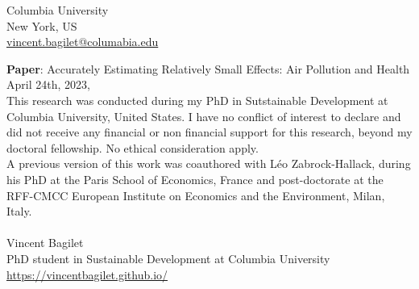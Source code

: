 \documentclass[11pt]{article}
\begin{document}

\begin{flushright}
Columbia University \\
New York, US \\
\url{vincent.bagilet@columabia.edu}
\end{flushright}

\textbf{Paper}: Accurately Estimating Relatively Small Effects: Air Pollution and Health \\

April 24th, 2023,  \\

This research was conducted during my PhD in Sutstainable Development at Columbia University, United States. I have no conflict of interest to declare and did not receive any financial or non financial support for this research, beyond my doctoral fellowship. No ethical consideration apply.\\

A previous version of this work was coauthored with Léo Zabrock-Hallack, during his PhD at the Paris School of Economics, France and post-doctorate at the RFF-CMCC European Institute on Economics and the Environment, Milan, Italy.
\\
\\
Vincent Bagilet \\
PhD student in Sustainable Development at Columbia University\\
\url{https://vincentbagilet.github.io/}
\end{document}
